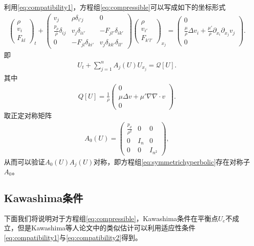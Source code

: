 利用\eqref{eq:compatibility1}，方程组\eqref{eq:compressible}可以写成如下的坐标形式
\begin{eqnarray*}
  \left( \begin{array}{c} \rho \\ v_i \\ F_{kl} \end{array} \right)_t
  +
  \left( \begin{array}{ccc} v_j & \rho \delta_{i'j} & 0 \\
    \frac{p_\rho}{\rho} \delta_{ij} & v_j \delta_{ii'} & -F_{jl'} \delta_{ik'} \\
    0 & - F_{jl}\delta_{ki'}  & v_j \delta_{kk'} \delta_{ll'} \end{array} \right)
  \left( \begin{array}{c} \rho \\ v_{i'} \\ F_{k'l'} \end{array} \right)_{x_j}
=
\left( \begin{array}{c} 0 \\ \frac{\mu}{\rho} \Delta {v_i} + \frac{\mu'}{\rho} \partial_{x_i} \partial_{x_j} v_j  \\ 0 \end{array} \right).
\end{eqnarray*}
即
\begin{eqnarray}\label{eq:symmetrichyperbolic}
  U_t + \sum_{j=1}^n A_j(U) U_{x_j} = \mathcal{Q}[U].
\end{eqnarray}
其中
\begin{eqnarray*}
  Q[U] = \frac{1}{\rho}\left( \begin{array}{c} 0\\ \mu\Delta  v + \mu'\nabla \nabla \cdot  v  \\ 0 \end{array} \right).
\end{eqnarray*}
取正定对称矩阵
\begin{eqnarray}
  A_0(U) = \left( \begin{array}{ccc} \frac{p_\rho}{\rho^2} & 0 & 0 \\
                                                   0 & I_n & 0 \\
						   0 & 0 & I_{n^2}\end{array} \right),
\end{eqnarray}
从而可以验证$A_0(U) A_j(U)$对称，即方程组\eqref{eq:symmetrichyperbolic}存在对称子$A_0$。

\subsection{Kawashima条件}
下面我们将说明对于方程组\eqref{eq:compressible}，Kawashima条件在平衡点$U_e$不成立，但是Kawashima等人论文\cite{shizuta1985systems,kawashima1984systems}中的类似估计可以利用适应性条件\eqref{eq:compatibility1}与\eqref{eq:compatibility2}得到。

